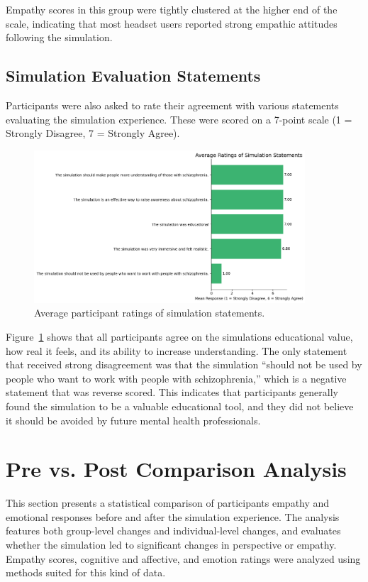 Empathy scores in this group were tightly clustered at the higher end of the scale, indicating that most headset users reported strong empathic attitudes following the simulation.

\subsection{Simulation Evaluation Statements}

Participants were also asked to rate their agreement with various statements evaluating the simulation experience. These were scored on a 7-point scale (1 = Strongly Disagree, 7 = Strongly Agree).

\begin{figure}[H]
    \centering
    \includegraphics[width=0.9\textwidth]{../../Figures/simulation-evaluation-post.png}
    \caption{Average participant ratings of simulation statements.}
    \label{fig:simulation_evaluation_post}
\end{figure}

Figure~\ref{fig:simulation_evaluation_post} shows that all participants agree on the simulations educational value, how real it feels, and its ability to increase understanding. The only statement that received strong disagreement was that the simulation “should not be used by people who want to work with people with schizophrenia,” which is a negative statement that was reverse scored. This indicates that participants generally found the simulation to be a valuable educational tool, and they did not believe it should be avoided by future mental health professionals.

\section{Pre vs. Post Comparison Analysis}
\label{sec:pre_post_comparison}
This section presents a statistical comparison of participants empathy and emotional responses before and after the simulation experience. The analysis features both group-level changes and individual-level changes, and evaluates whether the simulation led to significant changes in perspective or empathy. Empathy scores, cognitive and affective, and emotion ratings were analyzed using methods suited for this kind of data.

